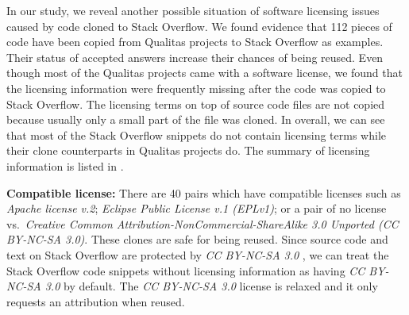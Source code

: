 \documentclass[sigconf,review, anonymous]{acmart}
\begin{document}
In our study, we reveal another possible situation of software
licensing issues caused by code cloned to Stack Overflow. We found
evidence that 112 pieces of code have been copied from Qualitas
projects to Stack Overflow as examples. Their status of accepted
answers increase their chances of being reused. Even though most of
the Qualitas projects came with a software license, we found that the licensing information
were frequently missing after the code was copied to Stack
Overflow. The licensing terms on top of source code files are not
copied because usually only a small part of the file was
cloned. In overall, we can see that most of the Stack Overflow snippets do not
contain licensing terms while their clone counterparts in Qualitas
projects do. The summary of
licensing information is listed in .

\textbf{Compatible license:} There are 40 pairs which have compatible
licenses such as \emph{Apache license v.2}; \emph{Eclipse Public
  License v.1 (EPLv1)}; or a pair of no license vs.~\emph{Creative
  Common Attribution-NonCommercial-ShareAlike 3.0 Unported (CC
  BY-NC-SA 3.0)}. These clones are safe for being reused. Since source
code and text on Stack Overflow are
protected by \emph{CC BY-NC-SA 3.0}
, we can treat the Stack Overflow code snippets
without licensing information as having \emph{CC BY-NC-SA 3.0} by
default. The \emph{CC BY-NC-SA 3.0} license is relaxed and it only
requests an attribution when reused.
\end{document}
